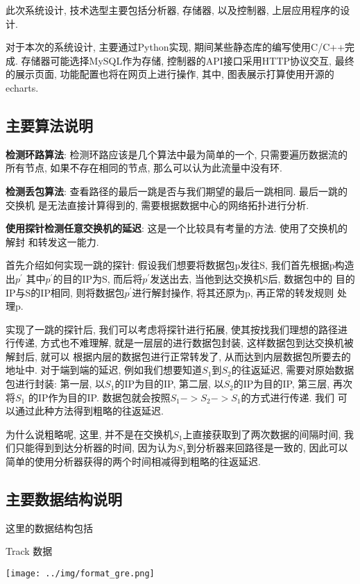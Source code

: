 {\begin{mdframed}[everyline=true]
此次系统设计, 技术选型主要包括分析器, 存储器, 以及控制器,
上层应用程序的设计.

对于本次的系统设计, 主要通过Python实现,
期间某些静态库的编写使用C/C++完成. 存储器可能选择MySQL作为存储,
控制器的API接口采用HTTP协议交互, 最终的展示页面,
功能配置也将在网页上进行操作, 其中, 图表展示打算使用开源的echarts.

\subsection{主要算法说明}

\textbf{检测环路算法}: 检测环路应该是几个算法中最为简单的一个,
只需要遍历数据流的所有节点, 如果不存在相同的节点,
那么可以认为此流量中没有环.

\textbf{检测丢包算法}: 查看路径的最后一跳是否与我们期望的最后一跳相同.
最后一跳的交换机 是无法直接计算得到的,
需要根据数据中心的网络拓扑进行分析.

\textbf{使用探针检测任意交换机的延迟}: 这是一个比较具有考量的方法.
使用了交换机的解封 和转发这一能力.

首先介绍如何实现一跳的探针: 假设我们想要将数据包p发往S,
我们首先根据p构造出\(p^{'}\) 其中\(p^{'}\)的目的IP为S,
而后将\(p^{'}\)发送出去, 当他到达交换机S后, 数据包中的
目的IP与S的IP相同, 则将数据包\(p^{'}\)进行解封操作, 将其还原为p,
再正常的转发规则 处理p.

实现了一跳的探针后, 我们可以考虑将探针进行拓展,
使其按找我们理想的路径进行传递, 方式也不难理解,
就是一层层的进行数据包封装, 这样数据包到达交换机被解封后, 就可以
根据内层的数据包进行正常转发了, 从而达到内层数据包所要去的地址中.
对于端到端的延迟, 例如我们想要知道\(S_{1}\)到\(S_{2}\)的往返延迟,
需要对原始数据包进行封装: 第一层, 以\(S_{1}\)的IP为目的IP, 第二层,
以\(S_{2}\)的IP为目的IP, 第三层, 再次将\(S_{1}\) 的IP作为目的IP.
数据包就会按照\(S_{1} -> S_{2} -> S_{1}\)的方式进行传递. 我们
可以通过此种方法得到粗略的往返延迟.

为什么说粗略呢, 这里,
并不是在交换机\(S_{1}\)上直接获取到了两次数据的间隔时间,
我们只能得到到达分析器的时间, 因为认为\(S_{1}\)到分析器来回路径是一致的,
因此可以 简单的使用分析器获得的两个时间相减得到粗略的往返延迟.

\subsection{主要数据结构说明}

这里的数据结构包括

Track 数据

\begin{center}
\texttt{[image: ../img/format\_gre.png]}
\label{gre_packet}
\end{center}


\end{mdframed}}
